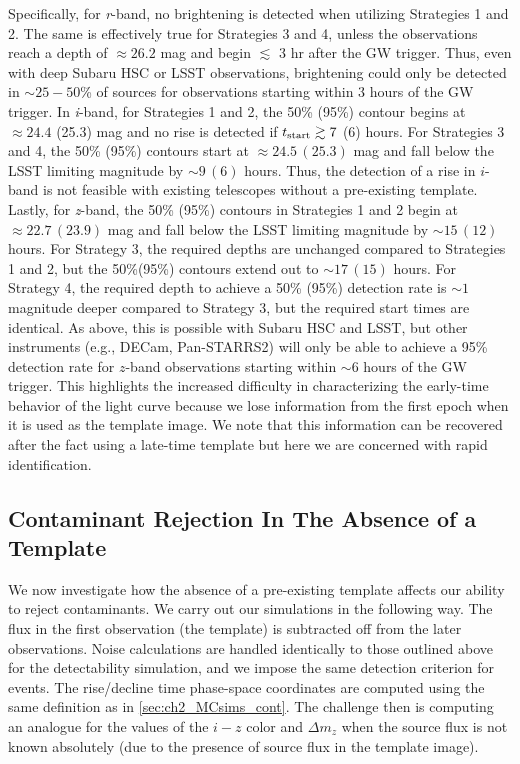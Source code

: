 Specifically, for {\em r}-band, no brightening is detected when utilizing Strategies 1 and 2. The same is effectively true for Strategies 3 and 4, unless the observations reach a depth of $\approx 26.2$ mag and begin $\lesssim$ 3 hr after the GW trigger. Thus, even with deep Subaru HSC or LSST observations, brightening could only be detected in $\sim25-50$\% of sources for observations starting within 3 hours of the GW trigger. In {\em i}-band, for Strategies 1 and 2, the 50\% (95\%) contour begins at $\approx 24.4$ (25.3) mag and no rise is detected if $t_{{\rm start}} \gtrsim 7$ (6) hours. For Strategies 3 and 4, the 50\% (95\%) contours start at $\approx 24.5\,(25.3)$ mag and fall below the LSST limiting magnitude by $\sim 9\,(6)$ hours. Thus, the detection of a rise in $i$-band is not feasible with existing telescopes without a pre-existing template. Lastly, for {\em z}-band, the 50\% (95\%) contours in Strategies 1 and 2 begin at $\approx 22.7\,(23.9)$ mag and fall below the LSST limiting magnitude by $\sim 15\,(12)$ hours. For Strategy 3, the required depths are unchanged compared to Strategies 1 and 2, but the 50\%(95\%) contours extend out to $\sim 17\,(15)$ hours. For Strategy 4, the required depth to achieve a 50\% (95\%) detection rate is $\sim 1$ magnitude deeper compared to Strategy 3, but the required start times are identical. As above, this is possible with Subaru HSC and LSST, but other instruments (e.g., DECam, Pan-STARRS2) will only be able to achieve a 95\% detection rate for $z$-band observations starting within $\sim6$ hours of the GW trigger. This highlights the increased difficulty in characterizing the early-time behavior of the light curve because we lose information from the first epoch when it is used as the template image. We note that this information can be recovered after the fact using a late-time template but here we are concerned with rapid identification.

\subsection{Contaminant Rejection In The Absence of a Template}
\label{sec:ch2_rejection}
We now investigate how the absence of a pre-existing template affects our ability to reject contaminants. We carry out our simulations in the following way. The flux in the first observation (the template) is subtracted off from the later observations. Noise calculations are handled identically to those outlined above for the detectability simulation, and we impose the same detection criterion for events. The rise/decline time phase-space coordinates are computed using the same definition as in \cref{sec:ch2_MCsims_cont}. The challenge then is computing an analogue for the values of the $i-z$ color and $\Delta m_z$ when the source flux is not known absolutely (due to the presence of source flux in the template image).

